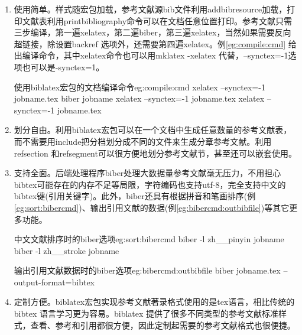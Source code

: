 \begin{enumerate}
\item 使用简单。样式随宏包加载，参考文献源bib文件利用addbibresource加载，打印文献表利用printbibliography命令可以在文档任意位置打印。参考文献只需三步编译，第一遍xelatex，第二遍biber，第三遍xelatex，当然如果需要反向超链接，除设置backref 选项外，还需要第四遍xelatex。例\ref{eg:compile:cmd} 给出编译命令，其中xelatex命令也可以用mklatex -xelatex 代替，--synctex=-1选项也可以是-synctex=1。

    \begin{codetex}{使用biblatex宏包的文档编译命令}{eg:compile:cmd}
    xelatex --synctex=-1 jobname.tex
    biber jobname
    xelatex --synctex=-1 jobname.tex
    xelatex --synctex=-1 jobname.tex
    \end{codetex}

\item 划分自由。利用biblatex宏包可以在一个文档中生成任意数量的参考文献表，而不需要用include把分档划分成不同的文件来生成分章参考文献。利用refsection 和refsegment可以很方便地划分参考文献节，甚至还可以嵌套使用。

\item 支持全面。后端处理程序biber处理大数据量参考文献毫无压力，不用担心bibtex可能存在的内存不足等局限，字符编码也支持utf-8，完全支持中文的bibtex键(引用关键字)。此外，biber还具有根据拼音和笔画排序(例\ref{eg:sort:bibercmd})、输出引用文献的数据(例\ref{eg:bibercmd:outbibfile})等其它更多功能。

        \begin{codetex}{中文文献排序时的biber选项}{eg:sort:bibercmd}
        biber -l zh__pinyin jobname
        biber -l zh__stroke jobname
        \end{codetex}

        \begin{codetex}{输出引用文献数据时的biber选项}{eg:bibercmd:outbibfile}
        biber jobname.tex --output-format=bibtex
        \end{codetex}


\item 定制方便。biblatex宏包实现参考文献著录格式使用的是tex语言，相比传统的bibtex 语言学习更为容易。biblatex 提供了很多不同类型的参考文献标准样式，查看、参考和引用都很方便，因此定制起需要的参考文献格式也很便捷。
\end{enumerate}

